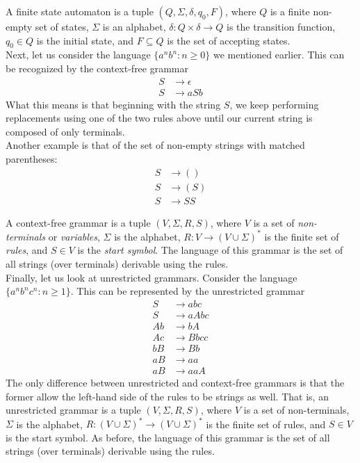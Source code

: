 A finite state automaton is a tuple $(Q,\Sigma,\delta,q_0,F)$, where $Q$ is a finite non-empty set of states, $\Sigma$ is an alphabet, $\delta : Q \times \delta \to Q$ is the transition function, $q_0 \in Q$ is the initial state, and $F \subseteq Q$ is the set of accepting states.\\

Next, let us consider the language $\{a^nb^n : n \ge 0\}$ we mentioned earlier. This can be recognized by the context-free grammar
\begin{align*}
	S &\to \epsilon \\
	S &\to aSb
\end{align*}
What this means is that beginning with the string $S$, we keep performing replacements using one of the two rules above until our current string is composed of only terminals.\\
Another example is that of the set of non-empty strings with matched parentheses:
\begin{align*}
	S &\to () \\
	S &\to (S) \\
	S &\to SS
\end{align*}

A context-free grammar is a tuple $(V,\Sigma,R,S)$, where $V$ is a set of \emph{non-terminals} or \emph{variables}, $\Sigma$ is the alphabet, $R : V \to (V \cup \Sigma)^*$ is the finite set of \emph{rules}, and $S \in V$ is the \emph{start symbol}. The language of this grammar is the set of all strings (over terminals) derivable using the rules.\\

Finally, let us look at unrestricted grammars. Consider the language $\{a^nb^nc^n : n \ge 1\}$. This can be represented by the unrestricted grammar
\begin{align*}
	S &\to abc \\
	S &\to aAbc \\
	Ab &\to bA \\
	Ac &\to Bbcc \\
	bB &\to Bb \\
	aB &\to aa \\
	aB &\to aaA
\end{align*}
The only difference between unrestricted and context-free grammars is that the former allow the left-hand side of the rules to be strings as well. That is, an unrestricted grammar is a tuple $(V,\Sigma,R,S)$, where $V$ is a set of non-terminals, $\Sigma$ is the alphabet, $R : (V \cup \Sigma)^* \to (V \cup \Sigma)^*$ is the finite set of rules, and $S \in V$ is the start symbol. As before, the language of this grammar is the set of all strings (over terminals) derivable using the rules.\\


